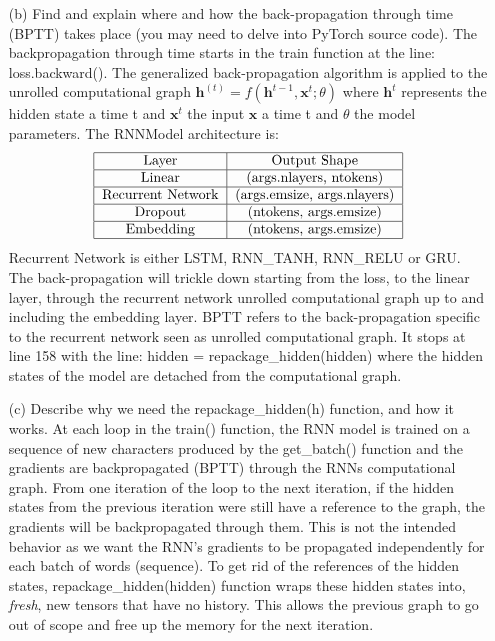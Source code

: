 \documentclass[11pt]{article}
\newcommand{\0}{\mat{0}}
\newcommand{\vect}[1]{\bm{#1}}     %
\begin{document}
\begin{itemize}
           
   \item[(b)]
   Find and explain where and how the back-propagation through time (BPTT) takes place (you may need to delve into PyTorch source code). 
   The backpropagation through time starts in the train function at the line: loss.backward(). The generalized back-propagation algorithm is applied to the unrolled computational graph $\vect{h}^(t) = f(\vect{h}^{t-1}, \vect{x}^t; \theta)$ where $\vect{h}^t$ represents the hidden state a time t and $\vect{x}^t$ the input $\vect{x}$ a time t and $\theta$ the model parameters.
   The RNNModel architecture is:
   \[
  	 \begin{tabular}{| c | c | c |}
  	  \hline
	  \text{Layer} & \text{Output Shape}  \\
	  \hline
	  \text{Linear} & \text{(args.nlayers, ntokens)}  \\
	  \hline
	  \text{Recurrent Network} & \text{(args.emsize, args.nlayers)}  \\
	  \hline
	  \text{Dropout} & \text{(ntokens, args.emsize)} \\
	  \hline
	  \text{Embedding} & \text{(ntokens, args.emsize)}  \\
	  \hline
	\end{tabular}
\] 
Recurrent Network is either LSTM, RNN\_TANH, RNN\_RELU or GRU. The back-propagation will trickle down starting from the loss, to the linear layer, through the recurrent network unrolled computational graph up to and including the embedding layer. BPTT refers to the back-propagation specific to the recurrent network seen as unrolled computational graph. It stops at line 158 with the line: hidden = repackage\_hidden(hidden) where the hidden states of the model are detached from the computational graph.
	
    \item[(c)]      
    Describe why we need the repackage\_hidden(h) function, and how it works.
 At each loop in the train() function, the RNN model is trained on a sequence of new characters produced by the  get\_batch() function and the gradients are backpropagated (BPTT) through the RNNs computational graph. From one iteration of the loop to the next iteration, if the hidden states from the previous iteration were still have a reference to the graph, the gradients will be backpropagated through them. This is not the intended behavior as we want the RNN's gradients to be propagated independently for each batch of words (sequence). To get rid of the references of the hidden states, repackage\_hidden(hidden) function  wraps these hidden states into, \textit{fresh}, new tensors that have no history. This allows the previous graph to go out of scope and free up the memory for the next iteration.
    

\end{itemize}
\end{document}
